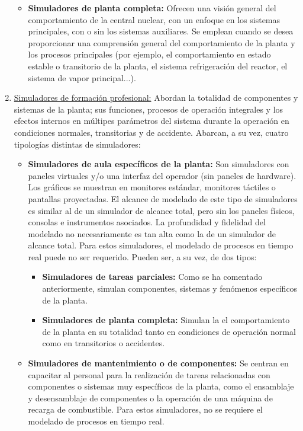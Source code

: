 \begin{enumerate}
\begin{itemize}
    \item \textbf{Simuladores de planta completa:} Ofrecen una visión general del comportamiento de la central nuclear, con un enfoque en los sistemas principales, con o sin los sistemas auxiliares. Se emplean cuando se desea proporcionar una comprensión general del comportamiento de la planta y los procesos principales (por ejemplo, el comportamiento en estado estable o transitorio de la planta, el sistema refrigeración del reactor, el sistema de vapor principal...).
  \end{itemize}
  \item \underline{Simuladores de formación profesional:} Abordan la totalidad de componentes y sistemas de la planta; sus funciones, procesos de operación integrales y los efectos internos en múltipes parámetros del sistema durante la operación en condiciones normales, transitorias y de accidente. Abarcan, a su vez, cuatro tipologías distintas de simuladores:
  \begin{itemize}
    \item \textbf{Simuladores de aula específicos de la planta:} Son simuladores con paneles virtuales y/o una interfaz del operador (sin paneles de hardware). Los gráficos se muestran en monitores estándar, monitores táctiles o pantallas proyectadas. El alcance de modelado de este tipo de simuladores es similar al de un simulador de alcance total, pero sin los paneles físicos, consolas e instrumentos asociados. La profundidad y fidelidad del modelado no necesariamente es tan alta como la de un simulador de alcance total. Para estos simuladores, el modelado de procesos en tiempo real puede no ser requerido. Pueden ser, a su vez, de dos tipos:
    \begin{itemize}
      \item \textbf{Simuladores de tareas parciales:} Como se ha comentado anteriormente, simulan componentes, sistemas y fenómenos específicos de la planta.
      \item \textbf{Simuladores de planta completa:} Simulan la el comportamiento de la planta en su totalidad tanto en condiciones de operación normal como en transitorios o accidentes.
    \end{itemize}
    \item \textbf{Simuladores de mantenimiento o de componentes:} Se centran en capacitar al personal para la realización de tareas relacionadas con componentes o sistemas muy específicos de la planta, como el ensamblaje y desensamblaje de componentes o la operación de una máquina de recarga de combustible. Para estos simuladores, no se requiere el modelado de procesos en tiempo real.

\end{itemize}
\end{enumerate}
